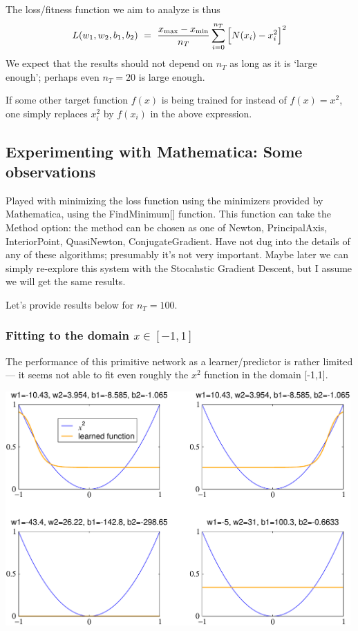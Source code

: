 \documentclass[12pt,a4paper]{article}
\begin{document}
The loss/fitness function we aim to analyze is thus 
\begin{equation}
L(w_1,w_2,b_1,b_2) ~=~  \frac{x_{\rm max} - x_{\rm min}}{n_T} \sum_{i=0}^{n_T} \Big[ N(x_i) -x_i^2 \Big]^2 
\end{equation}
%
We expect that the results should not depend on $n_T$ as long as it is `large enough'; perhaps
even $n_T=20$ is large enough. 

If some other target function $f(x)$ is being trained for instead of $f(x)=x^2$, one simply replaces
$x_i^2$ by $f(x_i)$ in the above expression.  


\subsection{Experimenting with Mathematica: Some observations}

Played with minimizing the loss function using the minimizers provided by Mathematica, using the 
FindMinimum[] function.  This function can take the Method option: the method can be chosen as one
of Newton, PrincipalAxis, InteriorPoint, QuasiNewton, ConjugateGradient.  Have not dug into the
details of any of these algorithms; presumably it's not very important.  Maybe later we can simply
re-explore this system with the Stocahstic Gradient Descent, but I assume we will get the same
results.  

Let's provide results below for $n_T=100$.  


\subsubsection{Fitting to the domain $x\in[-1,1]$}

The performance of this primitive network as a learner/predictor is rather limited --- it seems not
able to fit even roughly the $x^2$ function in the domain [-1,1].  

\smallskip

\begin{center}
\includegraphics[width=0.99\textwidth]{Images/3node_try_largedomain_a_01}
\end{center}
\end{document}

